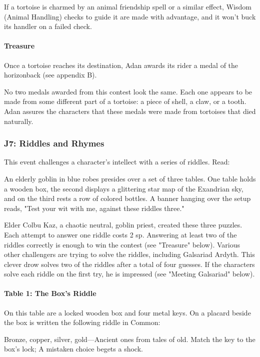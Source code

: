\documentclass[10pt,a4paper,twoside,bg=print,twocolumn,openany,nodeprecatedcode]{dndbook}
\begin{document}
If a tortoise is charmed by an animal friendship spell or a similar effect, Wisdom (Animal Handling) checks to guide it are made with advantage, and it won't buck its handler on a failed check.

\paragraph{Treasure}
Once a tortoise reaches its destination, Adan awards its rider a medal of the horizonback (see appendix B).

No two medals awarded from this contest look the same. Each one appears to be made from some different part of a tortoise: a piece of shell, a claw, or a tooth. Adan assures the characters that these medals were made from tortoises that died naturally.

\subsubsection{J7: Riddles and Rhymes}
This event challenges a character's intellect with a series of riddles. Read:

\begin{DndReadAloud}{}
An elderly goblin in blue robes presides over a set of three tables. One table holds a wooden box, the second displays a glittering star map of the Exandrian sky, and on the third rests a row of colored bottles. A banner hanging over the setup reads, "Test your wit with me, against these riddles three."

\end{DndReadAloud}

Elder Colbu Kaz, a chaotic neutral, goblin priest, created these three puzzles. Each attempt to answer one riddle costs 2 sp. Answering at least two of the riddles correctly is enough to win the contest (see "Treasure" below). Various other challengers are trying to solve the riddles, including Galsariad Ardyth. This clever drow solves two of the riddles after a total of four guesses. If the characters solve each riddle on the first try, he is impressed (see "Meeting Galsariad" below).

\paragraph{Table 1: The Box's Riddle}
On this table are a locked wooden box and four metal keys. On a placard beside the box is written the following riddle in Common:

\begin{DndReadAloud}{}
Bronze, copper, silver, gold—Ancient ones from tales of old. Match the key to the box's lock; A mistaken choice begets a shock.

\end{DndReadAloud}
\end{document}
